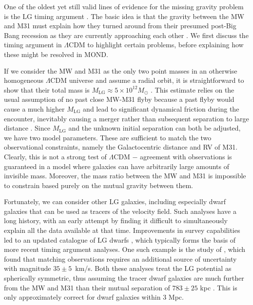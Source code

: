 \documentclass[fleqn,usenatbib,useAMS,onecolumn]{mnras} %
\begin{document}
One of the oldest yet still valid lines of evidence for the missing gravity problem is the LG timing argument \citep{Kahn_Woltjer_1959}. The basic idea is that the gravity between the MW and M31 must explain how they turned around from their presumed post-Big Bang recession as they are currently approaching each other \citep[e.g.][]{Van_der_Marel_2012}. We first discuss the timing argument in $\Lambda$CDM to highlight certain problems, before explaining how these might be resolved in MOND.

If we consider the MW and M31 as the only two point masses in an otherwise homogeneous $\Lambda$CDM universe and assume a radial orbit, it is straightforward to show that their total mass is $M_\text{LG} \approx 5 \times 10^{12} M_\odot$ \citep[e.g.][]{Li_White_2008}. This estimate relies on the usual assumption of no past close MW-M31 flyby because a past flyby would cause a much higher $M_\text{LG}$ \citep{Benisty_2019} and lead to significant dynamical friction during the encounter, inevitably causing a merger rather than subsequent separation to large distance \citep[e.g.][]{Privon_2013, Kroupa_2015}. Since $M_\text{LG}$ and the unknown initial separation can both be adjusted, we have two model parameters. These are sufficient to match the two observational constraints, namely the Galactocentric distance and RV of M31. Clearly, this is not a strong test of $\Lambda$CDM $-$ agreement with observations is guaranteed in a model where galaxies can have arbitrarily large amounts of invisible mass. Moreover, the mass ratio between the MW and M31 is impossible to constrain based purely on the mutual gravity between them.

Fortunately, we can consider other LG galaxies, including especially dwarf galaxies that can be used as tracers of the velocity field. Such analyses have a long history, with an early attempt by \citet{Sandage_1986} finding it difficult to simultaneously explain all the data available at that time. Improvements in survey capabilities led to an updated catalogue of LG dwarfs \citep{McConnachie_2012}, which typically forms the basis of more recent timing argument analyses. One such example is the study of \citet{Jorge_2014}, which found that matching observations requires an additional source of uncertainty with magnitude ${35 \pm 5}$~km/s. Both these analyses treat the LG potential as spherically symmetric, thus assuming the tracer dwarf galaxies are much further from the MW and M31 than their mutual separation of $783 \pm 25$ kpc \citep{McConnachie_2012}. This is only approximately correct for dwarf galaxies within 3 Mpc.
\end{document}
